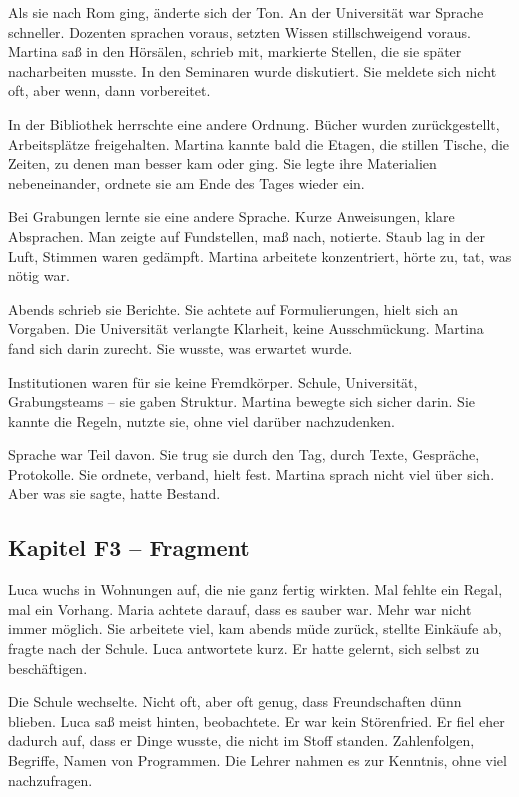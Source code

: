 \documentclass[
]{article}
\begin{document}
Als sie nach Rom ging, änderte sich der Ton. An der Universität war Sprache schneller. Dozenten sprachen voraus, setzten Wissen stillschweigend voraus. Martina saß in den Hörsälen, schrieb mit, markierte Stellen, die sie später nacharbeiten musste. In den Seminaren wurde diskutiert. Sie meldete sich nicht oft, aber wenn, dann vorbereitet.

In der Bibliothek herrschte eine andere Ordnung. Bücher wurden zurückgestellt, Arbeitsplätze freigehalten. Martina kannte bald die Etagen, die stillen Tische, die Zeiten, zu denen man besser kam oder ging. Sie legte ihre Materialien nebeneinander, ordnete sie am Ende des Tages wieder ein.

Bei Grabungen lernte sie eine andere Sprache. Kurze Anweisungen, klare Absprachen. Man zeigte auf Fundstellen, maß nach, notierte. Staub lag in der Luft, Stimmen waren gedämpft. Martina arbeitete konzentriert, hörte zu, tat, was nötig war.

Abends schrieb sie Berichte. Sie achtete auf Formulierungen, hielt sich an Vorgaben. Die Universität verlangte Klarheit, keine Ausschmückung. Martina fand sich darin zurecht. Sie wusste, was erwartet wurde.

Institutionen waren für sie keine Fremdkörper. Schule, Universität, Grabungsteams -- sie gaben Struktur. Martina bewegte sich sicher darin. Sie kannte die Regeln, nutzte sie, ohne viel darüber nachzudenken.

Sprache war Teil davon. Sie trug sie durch den Tag, durch Texte, Gespräche, Protokolle. Sie ordnete, verband, hielt fest. Martina sprach nicht viel über sich. Aber was sie sagte, hatte Bestand.

\subsection{Kapitel F3 -- Fragment}\label{kapitel-f3-fragment}

Luca wuchs in Wohnungen auf, die nie ganz fertig wirkten. Mal fehlte ein Regal, mal ein Vorhang. Maria achtete darauf, dass es sauber war. Mehr war nicht immer möglich. Sie arbeitete viel, kam abends müde zurück, stellte Einkäufe ab, fragte nach der Schule. Luca antwortete kurz. Er hatte gelernt, sich selbst zu beschäftigen.

Die Schule wechselte. Nicht oft, aber oft genug, dass Freundschaften dünn blieben. Luca saß meist hinten, beobachtete. Er war kein Störenfried. Er fiel eher dadurch auf, dass er Dinge wusste, die nicht im Stoff standen. Zahlenfolgen, Begriffe, Namen von Programmen. Die Lehrer nahmen es zur Kenntnis, ohne viel nachzufragen.
\end{document}
